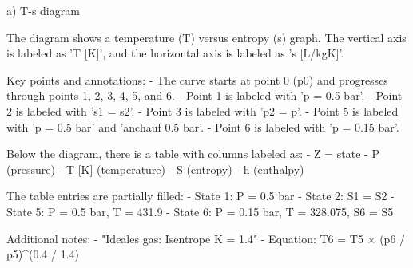 a) T-s diagram  

The diagram shows a temperature (T) versus entropy (s) graph. The vertical axis is labeled as 'T [K]', and the horizontal axis is labeled as 's [L/kgK]'.  

Key points and annotations:  
- The curve starts at point 0 (p0) and progresses through points 1, 2, 3, 4, 5, and 6.  
- Point 1 is labeled with 'p = 0.5 bar'.  
- Point 2 is labeled with 's1 = s2'.  
- Point 3 is labeled with 'p2 = p'.  
- Point 5 is labeled with 'p = 0.5 bar' and 'anchauf 0.5 bar'.  
- Point 6 is labeled with 'p = 0.15 bar'.  

Below the diagram, there is a table with columns labeled as:  
- Z = state  
- P (pressure)  
- T [K] (temperature)  
- S (entropy)  
- h (enthalpy)  

The table entries are partially filled:  
- State 1: P = 0.5 bar  
- State 2: S1 = S2  
- State 5: P = 0.5 bar, T = 431.9  
- State 6: P = 0.15 bar, T = 328.075, S6 = S5  

Additional notes:  
- "Ideales gas: Isentrope K = 1.4"  
- Equation: T6 = T5 × (p6 / p5)^(0.4 / 1.4)